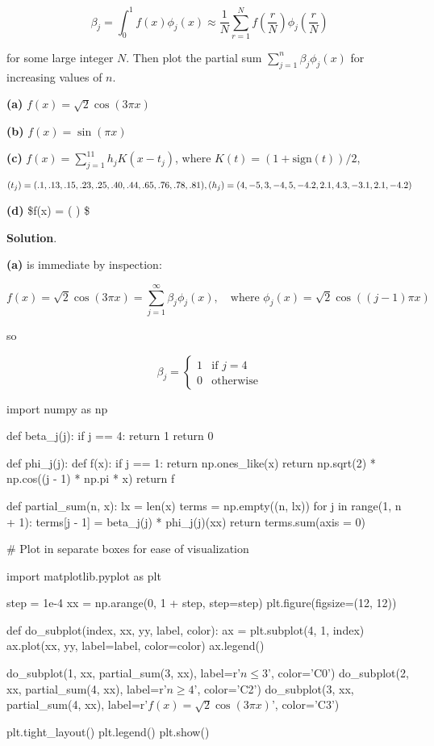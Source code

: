 \[ \beta_j = \int_0^1 f(x) \phi_j(x) \approx \frac{1}{N} \sum_{r=1}^N f \left( \frac{r}{N} \right) \phi_j \left( \frac{r}{N} \right) \]

for some large integer \(N\). Then plot the partial sum
\(\sum_{j=1}^n \beta_j \phi_j(x)\) for increasing values of \(n\).

\textbf{(a)} \(f(x) = \sqrt{2} \cos (3 \pi x)\)

\textbf{(b)} \(f(x) = \sin(\pi x)\)

\textbf{(c)} \(f(x) = \sum_{j=1}^{11} h_j K(x - t_j)\), where
\(K(t) = (1 + \text{sign}(t)) / 2\),

\[ 
(t_j) = (.1, .13, .15, .23, .25, .40, .44, .65, .76, .78, .81), \\
(h_j) = (4, -5, 3, -4, 5, -4.2, 2.1, 4.3, -3.1, 2.1, -4.2)
\]

\textbf{(d)} \$f(x) =  \sin \left(
 \right) \$

\textbf{Solution}.

\textbf{(a)} is immediate by inspection:

\[ f(x) = \sqrt{2} \cos(3 \pi x) = \sum_{j=1}^\infty \beta_j \phi_j(x), \quad \text{where } \phi_j(x) = \sqrt{2} \cos((j - 1) \pi x) \]

so

\[ \beta_j = \begin{cases}
1 & \text{if } j = 4 \\
0 & \text{otherwise}
\end{cases} \]

\begin{python}
import numpy as np

def beta_j(j):
    if j == 4:
        return 1
    return 0

def phi_j(j):
    def f(x):
        if j == 1:
            return np.ones_like(x)
        return np.sqrt(2) * np.cos((j - 1) * np.pi * x)
    return f

def partial_sum(n, x):
    lx = len(x)
    terms = np.empty((n, lx))
    for j in range(1, n + 1):
        terms[j - 1] = beta_j(j) * phi_j(j)(xx)
    return terms.sum(axis = 0)
\end{python}

\begin{python}
# Plot in separate boxes for ease of visualization

import matplotlib.pyplot as plt

step = 1e-4
xx = np.arange(0, 1 + step, step=step)
plt.figure(figsize=(12, 12))

def do_subplot(index, xx, yy, label, color):
    ax = plt.subplot(4, 1, index)
    ax.plot(xx, yy, label=label, color=color)
    ax.legend()    

do_subplot(1, xx, partial_sum(3,  xx), label=r'$n \leq 3$', color='C0')
do_subplot(2, xx, partial_sum(4,  xx), label=r'$n \geq 4$', color='C2')
do_subplot(3, xx, partial_sum(4,  xx), label=r'$f(x) = \sqrt{2} \cos (3 \pi x)$', color='C3')
    
plt.tight_layout()
plt.legend()
plt.show()
\end{python}

